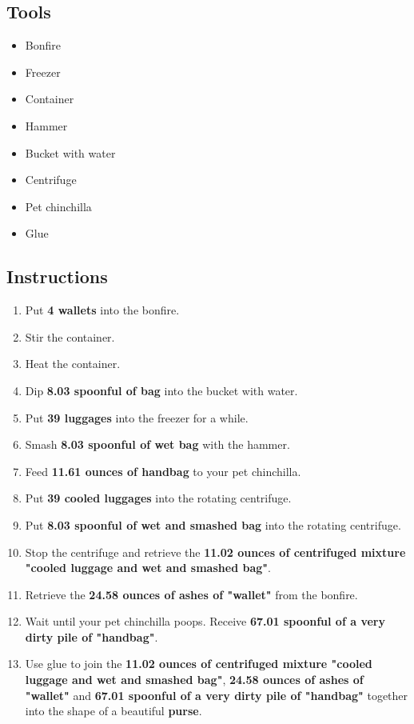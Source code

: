 \documentclass{article}
\begin{document}
\subsection{Tools}\begin{itemize}
\item 
Bonfire
\item 
Freezer
\item 
Container
\item 
Hammer
\item 
Bucket with water
\item 
Centrifuge
\item 
Pet chinchilla
\item 
Glue
\end{itemize}
\subsection{Instructions}\begin{enumerate}
\item 
Put \textbf{4 wallets} into the bonfire.
\item 
Stir the container.
\item 
Heat the container.
\item 
Dip \textbf{8.03 spoonful of bag} into the bucket with water.
\item 
Put \textbf{39 luggages} into the freezer for a while.
\item 
Smash \textbf{8.03 spoonful of wet bag} with the hammer.
\item 
Feed \textbf{11.61 ounces of handbag} to your pet chinchilla.
\item 
Put \textbf{39 cooled luggages} into the rotating centrifuge.
\item 
Put \textbf{8.03 spoonful of wet and smashed bag} into the rotating centrifuge.
\item 
Stop the centrifuge and retrieve the \textbf{11.02 ounces of centrifuged mixture "cooled luggage and wet and smashed bag"}.
\item 
Retrieve the \textbf{24.58 ounces of ashes of "wallet"} from the bonfire.
\item 
Wait until your pet chinchilla poops. Receive \textbf{67.01 spoonful of a very dirty pile of "handbag"}.
\item 
Use glue to join the \textbf{11.02 ounces of centrifuged mixture "cooled luggage and wet and smashed bag"}, \textbf{24.58 ounces of ashes of "wallet"} and \textbf{67.01 spoonful of a very dirty pile of "handbag"} together into the shape of a beautiful \textbf{purse}.
\end{enumerate}
\newpage
\end{document}

